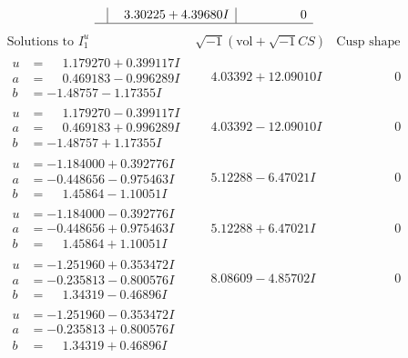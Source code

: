 \documentclass[1p]{elsarticle_modified}
\theoremstyle{definition}
\newcommand{\I}{\sqrt{-1}}
\begin{document}
$$\begin{array}{c|c|c}
 & \phantom{-}3.30225 + 4.39680 I & \phantom{-0.000000 } 0\\
 \hline 
 \end{array}$$\newpage$$\begin{array}{c|c|c}  
\text{Solutions to }I^u_{1}& \I (\text{vol} + \sqrt{-1}CS) & \text{Cusp shape}\\
 \hline 
\begin{aligned}
u &= \phantom{-}1.179270 + 0.399117 I \\
a &= \phantom{-}0.469183 - 0.996289 I \\
b &= -1.48757 - 1.17355 I\end{aligned}
 & \phantom{-}4.03392 + 12.09010 I & \phantom{-0.000000 } 0 \\ \hline\begin{aligned}
u &= \phantom{-}1.179270 - 0.399117 I \\
a &= \phantom{-}0.469183 + 0.996289 I \\
b &= -1.48757 + 1.17355 I\end{aligned}
 & \phantom{-}4.03392 - 12.09010 I & \phantom{-0.000000 } 0 \\ \hline\begin{aligned}
u &= -1.184000 + 0.392776 I \\
a &= -0.448656 - 0.975463 I \\
b &= \phantom{-}1.45864 - 1.10051 I\end{aligned}
 & \phantom{-}5.12288 - 6.47021 I & \phantom{-0.000000 } 0 \\ \hline\begin{aligned}
u &= -1.184000 - 0.392776 I \\
a &= -0.448656 + 0.975463 I \\
b &= \phantom{-}1.45864 + 1.10051 I\end{aligned}
 & \phantom{-}5.12288 + 6.47021 I & \phantom{-0.000000 } 0 \\ \hline\begin{aligned}
u &= -1.251960 + 0.353472 I \\
a &= -0.235813 - 0.800576 I \\
b &= \phantom{-}1.34319 - 0.46896 I\end{aligned}
 & \phantom{-}8.08609 - 4.85702 I & \phantom{-0.000000 } 0 \\ \hline\begin{aligned}
u &= -1.251960 - 0.353472 I \\
a &= -0.235813 + 0.800576 I \\
b &= \phantom{-}1.34319 + 0.46896 I\end{aligned}

\end{array}$$
\end{document}
